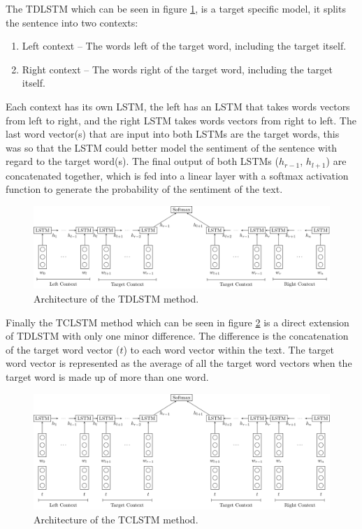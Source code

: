 The TDLSTM which can be seen in figure \ref{fig:repro_tdlstm_method}, is a target specific model, it splits the sentence into two contexts:
\begin{enumerate}
    \item Left context -- The words left of the target word, including the target itself.
    \item Right context -- The words right of the target word, including the target itself.
\end{enumerate}
Each context has its own LSTM, the left has an LSTM that takes words vectors from left to right, and the right LSTM takes words vectors from right to left. The last word vector(s) that are input into both LSTMs are the target words, this was so that the LSTM could better model the sentiment of the sentence with regard to the target word(s). The final output of both LSTMs ($h_{r-1}$, $h_{l+1}$) are concatenated together, which is fed into a linear layer with a softmax activation function to generate the probability of the sentiment of the text.

\begin{figure}[!h]
    \centering
    \includegraphics[scale=0.55]{Diagrams/Reproducibility/tang_tdlstm.pdf}
    \caption{Architecture of the TDLSTM method.}
    \label{fig:repro_tdlstm_method}
\end{figure}

Finally the TCLSTM method which can be seen in figure \ref{fig:repro_tclstm_method} is a direct extension of TDLSTM with only one minor difference. The difference is the concatenation of the target word vector ($t$) to each word vector within the text. The target word vector is represented as the average of all the target word vectors when the target word is made up of more than one word.

\begin{figure}[!h]
    \centering
    \includegraphics[scale=0.55]{Diagrams/Reproducibility/tang_tclstm.pdf}
    \caption{Architecture of the TCLSTM method.}
    \label{fig:repro_tclstm_method}
\end{figure}

